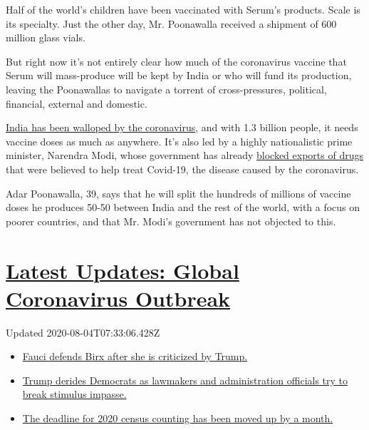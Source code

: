 Half of the world's children have been vaccinated with Serum's products.
Scale is its specialty. Just the other day, Mr. Poonawalla received a
shipment of 600 million glass vials.

But right now it's not entirely clear how much of the coronavirus
vaccine that Serum will mass-produce will be kept by India or who will
fund its production, leaving the Poonawallas to navigate a torrent of
cross-pressures, political, financial, external and domestic.

\href{https://www.nytimes.com/2020/07/16/world/asia/coronavirus-india-million-cases.html}{India
has been walloped by the coronavirus}, and with 1.3 billion people, it
needs vaccine doses as much as anywhere. It's also led by a highly
nationalistic prime minister, Narendra Modi, whose government has
already
\href{https://www.nytimes.com/2020/03/03/business/coronavirus-india-drugs.html}{blocked
exports of drugs} that were believed to help treat Covid-19, the disease
caused by the coronavirus.

Adar Poonawalla, 39, says that he will split the hundreds of millions of
vaccine doses he produces 50-50 between India and the rest of the world,
with a focus on poorer countries, and that Mr. Modi's government has not
objected to this.

\hypertarget{latest-updates-global-coronavirus-outbreak}{%
\section{\texorpdfstring{\href{https://www.nytimes.com/2020/08/03/world/coronavirus-covid-19.html?action=click\&pgtype=Article\&state=default\&region=MAIN_CONTENT_1\&context=storylines_live_updates}{Latest
Updates: Global Coronavirus
Outbreak}}{Latest Updates: Global Coronavirus Outbreak}}\label{latest-updates-global-coronavirus-outbreak}}

Updated 2020-08-04T07:33:06.428Z

\begin{itemize}
\tightlist
\item
  \href{https://www.nytimes.com/2020/08/03/world/coronavirus-covid-19.html?action=click\&pgtype=Article\&state=default\&region=MAIN_CONTENT_1\&context=storylines_live_updates\#link-4547638f}{Fauci
  defends Birx after she is criticized by Trump.}
\item
  \href{https://www.nytimes.com/2020/08/03/world/coronavirus-covid-19.html?action=click\&pgtype=Article\&state=default\&region=MAIN_CONTENT_1\&context=storylines_live_updates\#link-15e7f995}{Trump
  derides Democrats as lawmakers and administration officials try to
  break stimulus impasse.}
\item
  \href{https://www.nytimes.com/2020/08/03/world/coronavirus-covid-19.html?action=click\&pgtype=Article\&state=default\&region=MAIN_CONTENT_1\&context=storylines_live_updates\#link-e5a2cda}{The
  deadline for 2020 census counting has been moved up by a month.}
\end{itemize}

